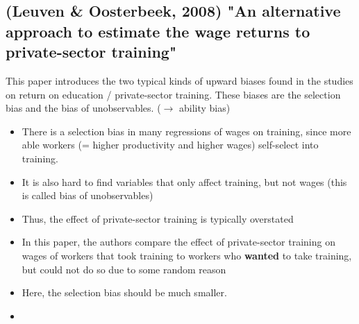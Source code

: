 \documentclass[12pt,a4paper]{article}
\begin{document}
  \subsection{(Leuven \& Oosterbeek, 2008) "An alternative approach to estimate the wage returns to private-sector training"} %
  \label{sub:}
  This paper introduces the two typical kinds of upward biases found in the studies on return on education / private-sector training. These biases
  are the selection bias and the bias of unobservables. ($\rightarrow$ ability bias)
  \begin{itemize}
    \item There is a selection bias in many regressions of wages on training, since more able workers (= higher productivity and higher wages) self-select into training.
    \item It is also hard to find variables that only affect training, but not wages (this is called bias of unobservables)
    \item Thus, the effect of private-sector training is typically overstated
    \item In this paper, the authors compare the effect of private-sector training on wages of workers that took training to workers who \textbf{wanted} to take training, but could not do so due to some random reason
    \item Here, the selection bias should be much smaller.
    \item 
  \end{itemize}
\end{document}
